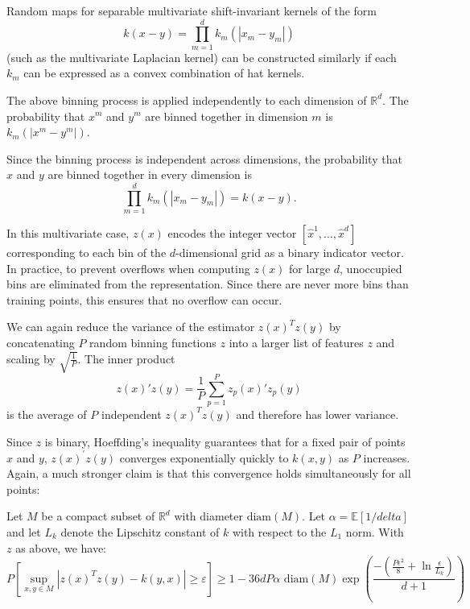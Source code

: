  Random maps for separable multivariate shift-invariant kernels of the form 
 \begin{equation}
    k(x - y) = \prod_{m=1}^d k_m(|x_m - y_m|)
 \end{equation}
  (such as the multivariate Laplacian kernel) 
  can be constructed similarly if each $k_m$ can be expressed as a convex combination of hat kernels. 
  
  The above binning process is applied independently to each dimension of $\mathbb{R}^d$. The probability that $x^m$ and $y^m$ are binned together in dimension $m$ is $k_m(|x^m - y^m|)$. 
  
  Since the binning process is independent across dimensions, the probability that $x$ and $y$ are binned together in every dimension is 
  \begin{equation}
    \prod_{m=1}^d k_m(|x_m - y_m|) = k(x - y).
  \end{equation}
   
  In this multivariate case, $z(x)$ encodes the integer vector $[\hat{x}^1, \dots, \hat{x}^d]$ corresponding to each bin of the $d$-dimensional grid as a binary indicator vector. In practice, to prevent overflows when computing $z(x)$ for large $d$, unoccupied bins are eliminated from the representation. Since there are never more bins than training points, this ensures that no overflow can occur.

  We can again reduce the variance of the estimator $z(x)^Tz(y)$ by concatenating $P$ random binning functions $z$ into a larger list of features $z$ and scaling by $\sqrt{\frac{1}{P}}$. The inner product 
  \begin{equation}
    z(x)'z(y) = \frac{1}{P}\sum_{p=1}^P z_p(x)'z_p(y)
  \end{equation}
 is the average of $P$ independent $z(x)^Tz(y)$ and therefore has lower variance.

 Since $z$ is binary, Hoeffding's inequality guarantees that for a fixed pair of points $x$ and $y$, $z(x)^\prime z(y)$ converges exponentially quickly to $k(x,y)$ as $P$ increases. Again, a much stronger claim is that this convergence holds simultaneously for all points:

 \begin{claim}
    Let $M$ be a compact subset of $\mathbb{R}^d$ with diameter $\text{diam}(M)$. Let $\alpha = \mathbb{E}[1/delta]$ and let $L_k$ denote the Lipschitz constant of $k$ with respect to the $L_1$ norm. With $z$ as above, we have:
    \begin{equation}
        P \left[
            \sup_{x,y \in M} |z(x)^T z(y) - k(y,x)|
            \geq \varepsilon
        \right]
        \geq
        1 - 36 d P \alpha
        \text{ diam}(M)
        \exp\left(
            \frac{
                - 
                \left( 
                    \frac{P \epsilon^2}{8}
                    +
                    \ln \frac{\epsilon}{L_k}
                \right)
            }{d +1 }
        \right)
    \end{equation}
 \end{claim}


